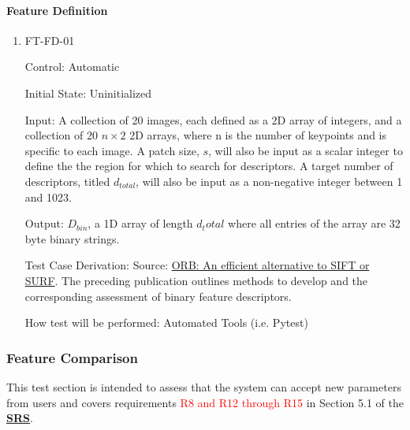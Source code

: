 \documentclass[12pt, titlepage]{article}
\begin{document}
\paragraph{Feature Definition}
\begin{enumerate}
\item \hypertarget{FT-FD-01}{FT-FD-01\\}
Control: Automatic

Initial State: Uninitialized

Input: A collection of 20 images, each defined as a 2D array of integers, and a collection of 20 $n\times 2$ 2D arrays, where n is the number of 
keypoints and is specific to each image. A patch size, $s$, will also be input as a scalar integer to define the the region for which to search for 
descriptors. A target number of descriptors, titled $d_{total}$, will also be input as a non-negative integer between 1 and 1023.

Output: $D_{bin}$, a 1D array of length $d_total$ where all entries of the array are 32 byte binary strings. 

Test Case Derivation: Source: \href{https://sites.cc.gatech.edu/classes/AY2024/cs4475_summer/images/ORB_an_efficient_alternative_to_SIFT_or_SURF.pdf}
{ORB: An efficient alternative to SIFT or SURF}. The preceding publication outlines methods 
to develop and the corresponding assessment of binary feature descriptors.

How test will be performed: Automated Tools (i.e. Pytest)
\end{enumerate}

\subsubsection{Feature Comparison}

This test section is intended to assess that the system can accept new parameters from users and covers 
requirements \textcolor{red}{R8 and R12 through R15} in Section 5.1 of the 
\textbf{\href{https://github.com/KiranSingh15/CAS-741-Image-Correspondences/blob/main/docs/SRS/SRS.pdf}
{SRS}}. 
		
\end{document}
